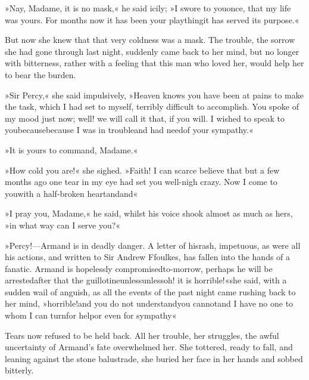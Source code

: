 »Nay, Madame, it is no mask,« he said icily; »I swore to you\textellipsis \allowbreak  once, that my life was yours. For months now it has been your plaything\textellipsis \allowbreak  \allowbreak it has served its purpose.«

But now she knew that that very coldness was a mask. The trouble, the sorrow she had gone through last night, suddenly came back to her mind, but no longer with bitterness, rather with a feeling that this man who loved her, would help her to bear the burden.

»Sir Percy,« she said impulsively, »Heaven knows you have been at pains to make the task, which I had set to myself, terribly difficult to accomplish. You spoke of my mood just now; well! we will call it that, if you will. I wished to speak to you\textellipsis \allowbreak  because\textellipsis \allowbreak  because I was in trouble\textellipsis \allowbreak  and had need\textellipsis \allowbreak  of your sympathy.«

»It is yours to command, Madame.«

»How cold you are!« she sighed. »Faith! I can scarce believe that but a few months ago one tear in my eye had set you well-nigh crazy. Now I come to you\textellipsis \allowbreak  with a half-broken heart\textellipsis \allowbreak  and\textellipsis \allowbreak  and\textellipsis«

»I pray you, Madame,« he said, whilst his voice shook almost as much as hers, »in what way can I serve you?«

»Percy!—Armand is in deadly danger. A letter of his\textellipsis \allowbreak  rash, impetuous, as were all his actions, and written to Sir Andrew Ffoulkes, has fallen into the hands of a fanatic. Armand is hopelessly compromised\textellipsis \allowbreak  to-morrow, perhaps he will be arrested\textellipsis \allowbreak  after that the guillotine\textellipsis \allowbreak  unless\textellipsis \allowbreak  unless\textellipsis \allowbreak  oh! it is horrible!«\textellipsis \allowbreak  she said, with a sudden wail of anguish, as all the events of the past night came rushing back to her mind, »horrible!\textellipsis \allowbreak  and you do not understand\textellipsis \allowbreak  you cannot\textellipsis \allowbreak  and I have no one to whom I can turn\textellipsis \allowbreak  for help\textellipsis \allowbreak  or even for sympathy\textellipsis«

Tears now refused to be held back. All her trouble, her struggles, the awful uncertainty of Armand's fate overwhelmed her. She tottered, ready to fall, and leaning against the stone balustrade, she buried her face in her hands and sobbed bitterly.

